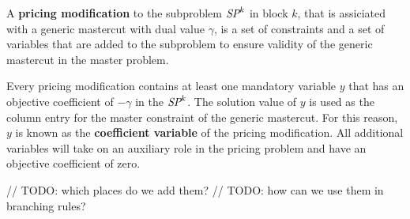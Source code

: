 \begin{definition}
A \textbf{pricing modification} to the subproblem $\SP{k}$ in block $k$, that is assiciated with a generic mastercut with dual value $\gamma$, is a set of constraints and a set of variables that are added to the subproblem to ensure validity of the generic mastercut in the master problem.

Every pricing modification contains at least one mandatory variable $y$ that has an objective coefficient of $-\gamma$ in the $\SP{k}$. The solution value of $y$ is used as the column entry for the master constraint of the generic mastercut. For this reason, $y$ is known as the \textbf{coefficient variable} of the pricing modification. All additional variables will take on an auxiliary role in the pricing problem and have an objective coefficient of zero.
\end{definition}

// TODO: which places do we add them?
// TODO: how can we use them in branching rules?


